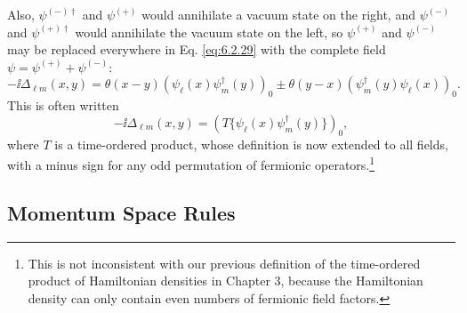 
Also, $\psi^{(-)\dagger}$ and $\psi^{(+)}$ would annihilate a vacuum state on
the right, and $\psi^{(-)}$ and $\psi^{(+)\dagger}$ would annihilate the vacuum
state on the left, so $\psi^{(+)}$ and $\psi^{(-)}$ may be replaced everywhere
in Eq. \eqref{eq:6.2.29} with the complete field $\psi=\psi^{(+)}+\psi^{(-)}$:
\begin{equation}
-\ii\Delta_{\ell m}(x,y)=\theta(x-y)(\psi_\ell(x)\psi_m^\dagger(y))_0
\mathbin{\pm}\theta(y-x)(\psi_m^\dagger(y)\psi_\ell(x))_0.
\tag{6.2.30}
\label{eq:6.2.30}
\end{equation}
This is often written
\begin{equation}
-\ii\Delta_{\ell m}(x,y)=(T\{\psi_\ell(x)\psi_m^\dagger(y)\})_0,
\tag{6.2.31}
\label{eq:6.2.31}
\end{equation}
where $T$ is a time-ordered product, whose definition is now extended
to all fields, with a minus sign for any odd permutation of fermionic
operators.\footnote{This is not inconsistent with our previous definition of
the time-ordered product of Hamiltonian densities in Chapter 3, because the
Hamiltonian density can only contain even numbers of fermionic field factors.}

\subsection{Momentum Space Rules}

